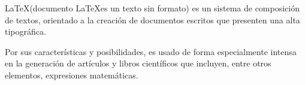 \documentclass{book}
\begin{document}


\LaTeX (documento \LaTeX es un texto sin formato) es \hspace{2cm} un sistema de composición de textos, orientado a la creación de documentos escritos que presenten una alta \hspace{-2cm} tipográfica.

\vspace{2cm} 
\vspace{-2cm} 

Por sus características y posibilidades, es usado de forma especialmente intensa en la generación de artículos y libros científicos que incluyen, entre otros elementos, expresiones matemáticas.
\end{document}
